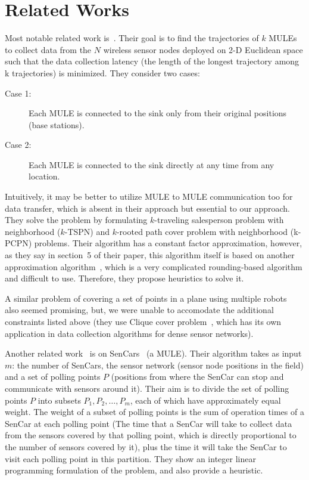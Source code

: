 \chapter{Related Works}
Most notable related work is~\cite{sim}. Their goal is to find the trajectories of $k$ MULEs to collect data from the $N$ wireless sensor nodes deployed on 2-D Euclidean space such that the data collection latency (the length of the longest trajectory among k trajectories) is minimized. They consider two cases: 
\begin{description}
\item[Case 1:] Each MULE is connected to the sink only from their original positions (base stations).
\item[Case 2:] Each MULE is connected to the sink directly at any time from any location.
\end{description}
Intuitively, it may be better to utilize MULE to MULE communication too for data transfer, which is absent in their approach but essential to our approach. They solve the problem by formulating $k$-traveling salesperson problem with neighborhood ($k$-TSPN) and $k$-rooted path cover problem with neighborhood (k-PCPN) problems. Their algorithm has a constant factor approximation, however, as they say in section~5 of their paper, this algorithm itself is based on another approximation algorithm~\cite{supportSim}, which is a very complicated rounding-based algorithm and difficult to use. Therefore, they propose heuristics to solve it.

A similar problem of covering a set of points in a plane using multiple robots~\cite{roboPlan} also seemed promising, but, we were unable to accomodate the additional constraints listed above (they use Clique cover problem~\cite{minCliquePartition}, which has its own application in data collection algorithms for dense sensor networks).

Another related work~\cite{sim4} is on SenCars~\cite{sencar} (a MULE). Their algorithm takes as input $m$: the number of SenCars, the sensor network (sensor node positions in the field) and a set of polling points $P$ (positions from where the SenCar can stop and communicate with sensors around it). Their aim is to divide the set of polling points $P$ into subsets $P_1, P_2, \ldots, P_m$, each of which have approximately equal weight. The weight of a subset of polling points is the sum of operation times of a SenCar at each polling point (The time that a SenCar will take to collect data from the sensors covered by that polling point, which is directly proportional to the number of sensors covered by it), plus the time it will take the SenCar to visit each polling point in this partition. They show an integer linear programming formulation of the problem, and also provide a heuristic.

